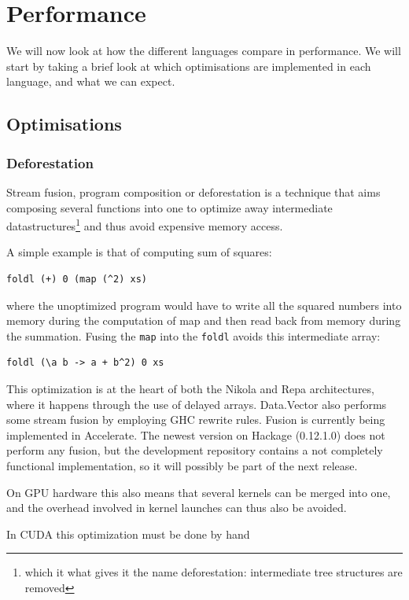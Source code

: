 \chapter{Performance}
We will now look at how the different languages compare in
performance. We will start by taking a brief look at which
optimisations are implemented in each language, and what we can expect.

\section{Optimisations}

\subsection{Deforestation}
Stream fusion, program composition or deforestation is a technique
that aims composing several functions into one to optimize away
intermediate datastructures\footnote{which it what gives it the name
  deforestation: intermediate tree structures are removed} and thus
avoid expensive memory access.

A simple example is that of computing sum of squares:
\begin{verbatim}
foldl (+) 0 (map (^2) xs)
\end{verbatim}
where the unoptimized program would have to write all the squared
numbers into memory during the computation of map and then read back
from memory during the summation. Fusing the \verb|map| into the
\verb|foldl| avoids this intermediate array:
\begin{verbatim}
foldl (\a b -> a + b^2) 0 xs
\end{verbatim}

This optimization is at the heart of both the Nikola and Repa
architectures, where it happens through the use of delayed
arrays. Data.Vector also performs some stream fusion by employing GHC
rewrite rules. Fusion is currently being implemented in
Accelerate. The newest version on Hackage (0.12.1.0) does not perform
any fusion, but the development repository contains a not completely
functional implementation, so it will possibly be part of the next
release.

On GPU hardware this also means that several kernels can be merged
into one, and the overhead involved in kernel launches can thus also
be avoided.

In CUDA this optimization must be done by hand 

